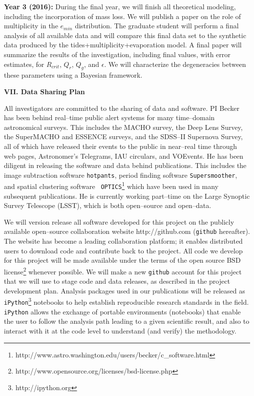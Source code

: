 {\bf Year 3 (2016):} During the final year, we will finish all
theoretical modeling, including the incorporation of mass loss.  We
will publish a paper on the role of multiplicity in the $e_{min}$
distribution. The graduate student will perform a final analysis of
all available \kepler data and will compare this final data set to the
synthetic data produced by the tides+multiplicity+evaporation model.
A final paper will summarize the results of the investigation,
including final values, with error estimates, for $R_{crit}$, $Q_r$,
$Q_g$, and $\epsilon$.  We will characterize the degeneracies between
these parameters using a Bayesian framework.



\bigskip
\centerline{\bf VII. Data Sharing Plan}
\smallskip

All investigators are committed to the sharing of data and software.
PI Becker has been behind real--time public alert systems for many
time--domain astronomical surveys.  This includes the MACHO survey,
the Deep Lens Survey, the SuperMACHO and ESSENCE surveys, and the
SDSS--II Supernova Survey, all of which have released their events to
the public in near--real time through web pages, Astronomer's
Telegrams, IAU circulars, and VOEvents.  He has been diligent in
releasing the software and data behind publications.  This includes
the image subtraction software {\tt hotpants}, period finding software
{\tt Supersmoother}, and spatial clustering software {\tt
  OPTICS}\footnote{http://www.astro.washington.edu/users/becker/c\_software.html}
which have been used in many subsequent publications.  He is currently
working part--time on the Large Synoptic Survey Telescope (LSST),
which is both open--source and open--data.

We will version release all software developed for this project on the
publicly available open--source collaboration website
http://github.com ({\tt github} hereafter).  The website has become a
leading collaboration platform; it enables distributed users to
download code and contribute back to the project.  All code we develop
for this project will be made available under the terms of the open
source BSD
license\footnote{http://www.opensource.org/licenses/bsd-license.php}
whenever possible.  We will make a new {\tt github} account for this
project that we will use to stage code and data releases, as described
in the project development plan.  Analysis packages used in our
publications will be released as {\tt
iPython}\footnote{http://ipython.org} notebooks to help establish
reproducible research standards in the field.  {\tt iPython} allows
the exchange of portable environments (notebooks) that enable the user
to follow the analysis path leading to a given scientific result, and
also to interact with it at the code level to understand (and verify)
the methodology.


